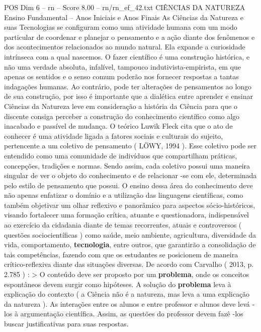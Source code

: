 \begin{textsample}{POS Dim 6 – rn – Score 8.00 – rn/rn\_ef\_42.txt}  \label{ex:f6_pos_233}
CIÊNCIAS DA NATUREZA Ensino Fundamental – Anos Iniciais e Anos Finais As Ciências da Natureza e suas Tecnologias se configuram como uma atividade humana com um modo particular de coordenar e planejar o pensamento e a ação diante dos fenômenos e dos acontecimentos relacionados ao mundo natural.
Ela expande a curiosidade intrínseca com a qual nascemos.
O fazer científico é uma construção histórica, e não uma verdade absoluta, infalível, tampouco indutivista-empirista, em que apenas os sentidos e o senso comum poderão nos fornecer respostas a tantas indagações humanas.
Ao contrário, pode ter alterações de pensamentos ao longo de sua construção, por isso é importante que a dialética entre aprender e ensinar Ciências da Natureza leve em consideração a história da Ciência para que o discente consiga perceber a construção do conhecimento científico como algo inacabado e passível de mudança.
O teórico Luwik Fleck cita que o ato de conhecer é uma atividade ligada a fatores sociais e culturais do sujeito, pertencente a um coletivo de pensamento ( LÖWY, 1994 ).
Esse coletivo pode ser entendido como uma comunidade de indivíduos que compartilham práticas, concepções, tradições e normas.
Sendo assim, cada coletivo possui uma maneira singular de ver o objeto do conhecimento e de relacionar -se com ele, determinada pelo estilo de pensamento que possui.
O ensino dessa área do conhecimento deve não apenas enfatizar o domínio e a utilização das linguagens científicas, como também objetivar um olhar reflexivo e panorâmico para aspectos sócio-históricos, visando fortalecer uma formação crítica, atuante e questionadora, indispensável ao exercício da cidadania diante de temas recorrentes, atuais e controversos ( questões sociocientíficas ) como saúde, meio ambiente, agricultura, diversidade da vida, comportamento, \textbf{tecnologia}, entre outros, que garantirão a consolidação de tais competências, fazendo com que os estudantes se posicionem de maneira crítico-reflexiva diante das situações diversas.
De acordo com Carvalho ( 2013, p. 2.785 ) : > O conteúdo deve ser proposto por um \textbf{problema}, onde os conceitos espontâneos devem surgir como hipóteses.
A solução do \textbf{problema} leva à explicação do contexto ( a Ciência não é a natureza, mas leva a uma explicação da natureza ).
As interações entre os alunos e entre professor e alunos deve levá -los à argumentação científica.
Assim, as questões do professor devem fazê -los buscar justificativas para suas respostas.

\end{textsample}
